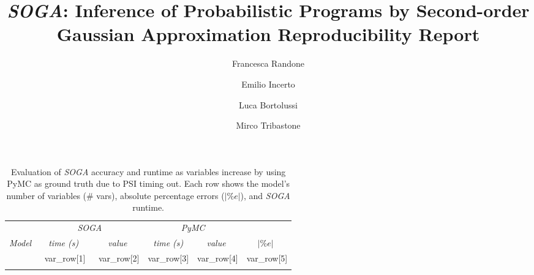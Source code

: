 \documentclass[a4paper]{llncs}
\newcommand{\soga}{\textsl{SOGA}}
\begin{document}
\mainmatter

\title{\soga: Inference of Probabilistic Programs by Second-order Gaussian Approximation Reproducibility Report}


\author{Francesca Randone  \and Emilio Incerto  \and Luca Bortolussi  \and Mirco Tribastone}

\allowdisplaybreaks[0]

\maketitle
\setcounter{table}{1}
\begin{table}[t]
    \centering
    \caption{Evaluation of \soga{} accuracy and runtime as variables increase by using PyMC as ground truth due to PSI timing out. Each row shows the model's number of variables (\# vars), absolute percentage errors ($|\%e|$), and \soga{} runtime.} 
     \begin{tabular}{cccccc}
     \toprule 
        &\multicolumn{2}{c}{\emph{SOGA}}&\multicolumn{2}{c}{\emph{PyMC}}\\
        \cmidrule(l){2-3}  \cmidrule(l){4-5}
        \emph{Model}&
    \ \ \emph{time (s)}  \ \ &  \ \  \emph{value} \ \ & \emph{time (s)} 
    & \ \  \emph{value} \ \  &\ \  $|\%e|$ \ \  \\
    \midrule{%
        $\textsl{{ '{' }}{{var_row[0]}}{{ '}' }}_{{ '{' }}{{var_row[-1]}}{{ '}' }}$ & {{var_row[1]}} & {{var_row[2]}} & {{var_row[3]}} & {{var_row[4]}} &{{var_row[5]}} \\{%
    \bottomrule
    \end{tabular}
    \label{tab:sensVar}
\end{table}
\end{document}
